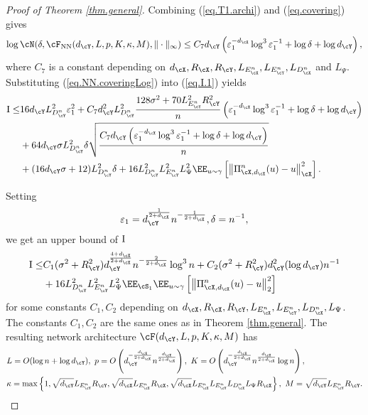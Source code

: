 \documentclass[11pt]{article} %
\begin{document}
\begin{proof}[Proof of Theorem \ref{thm.general}]
Combining (\ref{eq.T1.archi}) and (\ref{eq.covering}) gives
\begin{align}
	\log \cN(\delta,\cF_{\rm NN}(d_{\cY},L,p,K,\kappa,M),\|\cdot\|_{\infty})\leq C_{7}d_{\cY}\left(\varepsilon_1^{-d_{\cX}}\log^3 \varepsilon_1^{-1}+\log \delta + \log d_{\cY}\right), \label{eq.NN.coveringLog}
\end{align}
where $C_{7}$ is a constant depending on $d_{\cX},R_{\cX},R_{\cY},L_{E^n_{\cX}}, L_{E^n_{\cY}},L_{D^n_{\cX}}$ and $L_{\Psi}$. Substituting (\ref{eq.NN.coveringLog}) into (\ref{eq.I.1}) yields
\begin{align}
	{\rm I}\leq &16d_{\cY}L_{D^n_{\cY}}^2\varepsilon_1^2+C_{7}d_{\cY}^2L_{D^n_{\cY}}^2\frac{128\sigma^2+70L_{E^n_{\cY}}^2R_{\cY}^2}{n}\left(\varepsilon_1^{-d_{\cX}}\log^3 \varepsilon_1^{-1}+\log \delta + \log d_{\cY}\right)  \nonumber\\
	&+ 64d_{\cY}\sigma L_{D^n_{\cY}}^2\delta \sqrt{\frac{C_{7}d_{\cY}\left(\varepsilon_1^{-d_{\cX}}\log^3 \varepsilon_1^{-1}+\log \delta + \log d_{\cY}\right) }{n}} \nonumber\\
	&+(16d_{\cY}\sigma+12) L_{D^n_{\cY}}^2 \delta +16L_{D^n_{\cY}}^2 L_{E^n_{\cY}}^2L_{\Psi}^2\EE_{u\sim \gamma}\left[\left\| \Pi_{\cX,d_{\cX}}^n(u)- u\right\|_{\cX}^2\right].
	\label{eq.I.3}
\end{align}

Setting
$$\varepsilon_1=d_{\cY}^{\frac{1}{2+d_{\cX}}}n^{-\frac{1}{2+d_{\cX}}}, \delta=n^{-1},$$
we get an upper bound of ${\rm I}$
\begin{align}
	{\rm I}\leq &C_1(\sigma^2+R_{\cY}^2)d_{\cY}^{\frac{4+d_{\cX}}{2+d_{\cX}}}n^{-\frac{2}{2+d_{\cX}}}\log^3 n +C_2(\sigma^2+R_{\cY}^2)d_{\cY}^2(\log d_{\cY})n^{-1}\nonumber \\
	& + 16L_{D^n_{\cY}}^2L_{E^n_{\cY}}^2L_{\Psi}^2\EE_{\cS_1}\EE_{u\sim \gamma}\left[\left\| \Pi_{\cX,d_{\cX}}^n(u)- u\right\|_{2}^2\right]
	\label{eq.I.4}
\end{align}
for some constants $C_1,C_2$ depending on $d_{\cX},R_{\cX},R_{\cY},L_{E^n_{\cX}}, L_{E^n_{\cY}},L_{D^n_{\cX}},L_{\Psi}$. The constants $C_1,C_2$ are the same ones as in Theorem \ref{thm.general}. The resulting network architecture $\cF(d_{\cY},L,p,K,\kappa,M)$ has
\begin{equation}
	\begin{aligned}
		&L=O(\log n+\log d_{\cY}), \ p=O\left(d_{\cY}^{-\frac{d_{\cX}}{2+d_{\cX}}}n^{\frac{d_{\cX}}{2+d_{\cX}}}\right),\ K=O\left(d_{\cY}^{-\frac{d_{\cX}}{2+d_{\cX}}}n^{\frac{d_{\cX}}{2+d_{\cX}}}\log n\right), \\
		&  \kappa=\max\left\{1,\sqrt{d_{\cY}}L_{E^n_{\cY}}R_{\cY}, \sqrt{d_{\cX}}L_{E^n_{\cX}}R_{\cX},\sqrt{d_{\cX}}L_{E^n_{\cX}}L_{E^n_{\cY}}L_{D^n_{\cX}}L_{\Psi}R_{\cX} \right\},\ M=\sqrt{d_{\cY}}L_{E^n_{\cY}}R_{\cY}.
	\end{aligned}\label{eq.NN.parameter.n.1}
\end{equation}




\end{proof}
\end{document}
